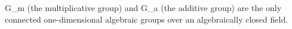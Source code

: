G_m (the multiplicative group) and G_a (the additive group) are the only connected one-dimensional algebraic groups over an algebraically closed field.
